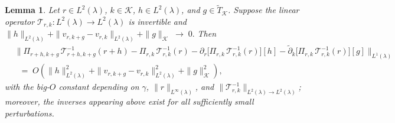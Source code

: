 \documentclass[11pt]{article}
\newcommand{\addTK}{\widetilde T_{\mathcal K}}
\newcommand{\adk}{\widetilde{\partial}_k}
\theoremstyle{plain}
\newtheorem{lemma}[theorem]{Lemma}
\begin{document}
\begin{lemma}
\label{lemma::jointderivative}
Let $r \in L^2(\lambda)$, $k \in \mathcal{K}$, 
$h \in L^2(\lambda)$, and $g \in \addTK$. 
Suppose the linear operator
$\mathcal{T}_{r,k}:L^2(\lambda) \to L^2(\lambda)$ is invertible and $\|h\|_{L^2(\lambda)}+\|v_{r,k+g}-v_{r,k}\|_{L^2(\lambda)}+\|g\|_{\mathcal K} \;\to\; 0.$
Then
\begin{align*}
&\big\|\Pi_{r+h,k+g}\,\mathcal{T}_{r+h,k+g}^{-1}(r+h) 
- \Pi_{r,k}\,\mathcal{T}_{r,k}^{-1}(r) 
- \partial_r\!\big[\Pi_{r,k}\,\mathcal{T}_{r,k}^{-1}(r)\big][h]
- \adk\!\big[\Pi_{r,k}\,\mathcal{T}_{r,k}^{-1}(r)\big][g]\big\|_{L^1(\lambda)} \\
&\;\;=\; O\!\left(\|h\|_{L^2(\lambda)}^{2} 
+ \|v_{r,k+g}-v_{r,k}\|_{L^2(\lambda)}^{2} 
+ \|g\|_{\mathcal K}^{2}\right),
\end{align*}
with the big-$O$ constant depending on $\gamma$, $\|r\|_{L^\infty(\lambda)}$, 
and $\|\mathcal{T}_{r,k}^{-1}\|_{L^2(\lambda)\to L^2(\lambda)}$; moreover, the inverses appearing above exist for all sufficiently small perturbations.
\end{lemma}
\end{document}
